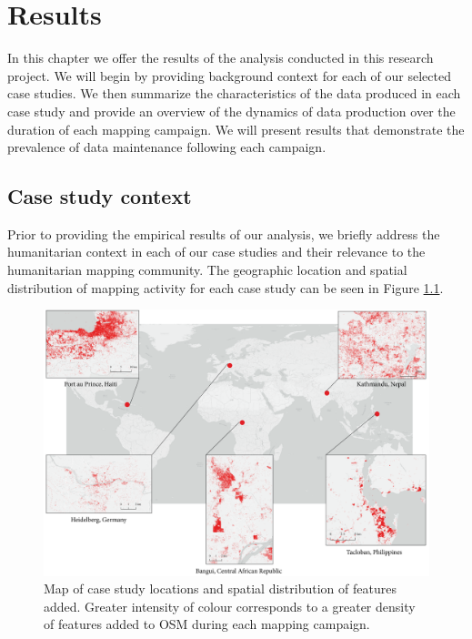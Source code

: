 \chapter{Results}
\label{chapterlabel5}

In this chapter we offer the results of the analysis conducted in this research project. We will begin by providing background context for each of our selected case studies. We then summarize the characteristics of the data produced in each case study and provide an overview of the dynamics of data production over the duration of each mapping campaign. We will present results that demonstrate the prevalence of data maintenance following each campaign. 

\section{Case study context}

Prior to providing the empirical results of our analysis, we briefly address the humanitarian context in each of our case studies and their relevance to the humanitarian mapping community. The geographic location and spatial distribution of mapping activity for each case study can be seen in Figure \ref{fig:map}.

\begin{figure} %
    \centering %
    \includegraphics[width = \textwidth]{Images/sum_map.png} %
    \caption[Map of case study locations and spatial distribution of features added.]{Map of case study locations and spatial distribution of features added. Greater intensity of colour corresponds to a greater density of features added to OSM during each mapping campaign.} %
    \label{fig:map} %
\end{figure}

